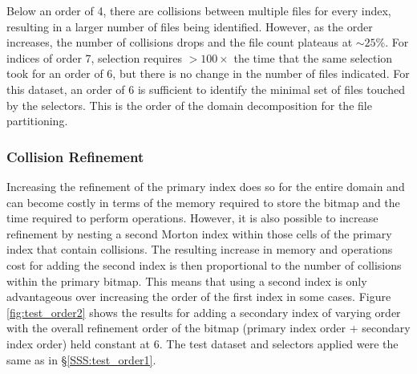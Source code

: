 \documentclass[apjl]{emulateapj}
\begin{document}
Below an order of 4, there are collisions between multiple files for every index, resulting in a larger number of files being identified. However, as the order increases, the number of collisions drops and the file count plateaus at $\sim25$\%. For indices of order 7, selection requires $>100\times$ the time that the same selection took for an order of 6, but there is no change in the number of files indicated. For this dataset, an order of 6 is sufficient to identify the minimal set of files touched by the selectors. This is the order of the domain decomposition for the file partitioning.


\subsubsection{Collision Refinement}\label{SSS:test_order2}
Increasing the refinement of the primary index does so for the entire domain and can become costly in terms of the memory required to store the bitmap and the time required to perform operations. However, it is also possible to increase refinement by nesting a second Morton index within those cells of the primary index that contain collisions. The resulting increase in memory and operations cost for adding the second index is then proportional to the number of collisions within the primary bitmap. This means that using a second index is only advantageous over increasing the order of the first index in some cases. Figure \ref{fig:test_order2} shows the results for adding a secondary index of varying order with the overall refinement order of the bitmap (primary index order + secondary index order) held constant at 6. The test dataset and selectors applied were the same as in \S\ref{SSS:test_order1}.
%
\end{document}
